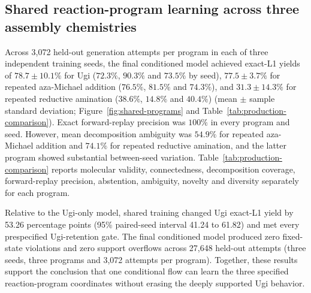 \documentclass{article}
\newcommand{\ForgeUgiRetentionCIHighPP}{61.82}
\newcommand{\ForgeUgiRetentionCILowPP}{41.24}
\newcommand{\ForgeUgiRetentionDifferencePP}{53.26}
\begin{document}
\subsection{Shared reaction-program learning across three assembly chemistries}

Across 3,072 held-out generation attempts per program in each of three independent training seeds,
the final conditioned model achieved exact-L1 yields of $78.7\pm10.1\%$ for Ugi
($72.3\%$, $90.3\%$ and $73.5\%$ by seed), $77.5\pm3.7\%$ for repeated aza-Michael
addition ($76.5\%$, $81.5\%$ and $74.3\%$), and $31.3\pm14.3\%$ for repeated reductive
amination ($38.6\%$, $14.8\%$ and $40.4\%$) (mean $\pm$ sample standard deviation;
Figure~\ref{fig:shared-programs} and Table~\ref{tab:production-comparison}).
Exact forward-replay precision was $100\%$ in every program and seed. However, mean
decomposition ambiguity was $54.9\%$ for repeated aza-Michael addition and $74.1\%$ for
repeated reductive amination, and the latter program showed substantial between-seed variation.
Table~\ref{tab:production-comparison} reports molecular validity, connectedness, decomposition
coverage, forward-replay precision, abstention, ambiguity, novelty and diversity separately for
each program.

Relative to the Ugi-only model, shared training changed Ugi exact-L1 yield by
\ForgeUgiRetentionDifferencePP{} percentage points (95\% paired-seed interval
\ForgeUgiRetentionCILowPP{} to \ForgeUgiRetentionCIHighPP) and met every prespecified Ugi-retention
gate.
The final conditioned model produced zero fixed-state violations and zero support overflows across
27,648 held-out attempts (three seeds, three programs and 3,072 attempts per program).
Together, these results support the conclusion that one conditional flow can learn the three
specified reaction-program coordinates without erasing the deeply supported Ugi behavior.
\end{document}
